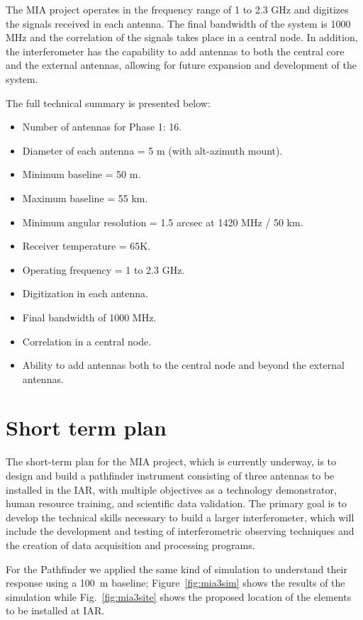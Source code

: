 \documentclass[baaa]{baaa}
\begin{document}
The MIA project operates in the frequency range of 1 to 2.3 GHz and digitizes the signals received in each antenna. The final bandwidth of the system is 1000 MHz and the correlation of the signals takes place in a central node. In addition, the interferometer has the capability to add antennas to both the central core and the external antennas, allowing for future expansion and development of the system.

The full technical summary is presented below:
\begin{itemize}
    \item Number of antennas for Phase 1: 16.
    \item Diameter of each antenna = 5 m (with alt-azimuth mount).
    \item Minimum baseline = 50 m.
    \item Maximum baseline = 55 km.
    \item Minimum angular resolution = 1.5 arcsec at 1420 MHz / 50 km.
    \item Receiver temperature = 65K.
    \item Operating frequency = 1 to 2.3 GHz.
    \item Digitization in each antenna.
    \item Final bandwidth of 1000 MHz.
    \item Correlation in a central node.
    \item Ability to add antennas both to the central node and beyond the external antennas.
\end{itemize}

\section{Short term plan}
\label{sec:plan}


The short-term plan for the MIA project, which is currently underway, is to design and build a pathfinder instrument consisting of three antennas to be installed in the IAR, with multiple objectives as a technology demonstrator, human resource training, and scientific data validation. The primary goal is to develop the technical skills necessary to build a larger interferometer, which will include the development and testing of interferometric observing techniques and the creation of data acquisition and processing programs.

 For the Pathfinder we applied the same kind of simulation to understand their response using a 100~m baseline; Figure~\ref{fig:mia3sim} shows the results of the simulation while  Fig.~\ref{fig:mia3site} shows the proposed location of the elements to be installed at IAR.
\end{document}
